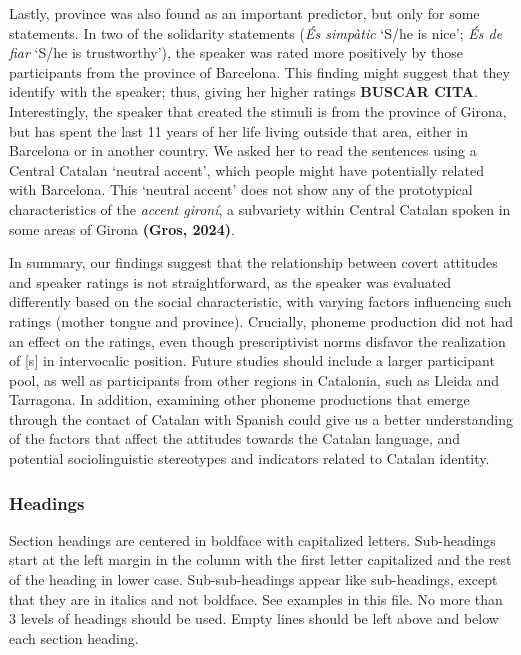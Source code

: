 \documentclass[
  a4paper,
  11pt,
  twocolumn]{article}
\begin{document}
Lastly, province was also found as an important predictor, but only for
some statements. In two of the solidarity statements (\emph{És simpàtic}
`S/he is nice'; \emph{És de fiar} `S/he is trustworthy'), the speaker
was rated more positively by those participants from the province of
Barcelona. This finding might suggest that they identify with the
speaker; thus, giving her higher ratings \textbf{BUSCAR CITA}.
Interestingly, the speaker that created the stimuli is from the province
of Girona, but has spent the last 11 years of her life living outside
that area, either in Barcelona or in another country. We asked her to
read the sentences using a Central Catalan `neutral accent', which
people might have potentially related with Barcelona. This `neutral
accent' does not show any of the prototypical characteristics of the
\emph{accent gironí}, a subvariety within Central Catalan spoken in some
areas of Girona \textbf{(Gros, 2024)}.

In summary, our findings suggest that the relationship between covert
attitudes and speaker ratings is not straightforward, as the speaker was
evaluated differently based on the social characteristic, with varying
factors influencing such ratings (mother tongue and province).
Crucially, phoneme production did not had an effect on the ratings, even
though prescriptivist norms disfavor the realization of {[}s{]} in
intervocalic position. Future studies should include a larger
participant pool, as well as participants from other regions in
Catalonia, such as Lleida and Tarragona. In addition, examining other
phoneme productions that emerge through the contact of Catalan with
Spanish could give us a better understanding of the factors that affect
the attitudes towards the Catalan language, and potential
sociolinguistic stereotypes and indicators related to Catalan identity.

\subsubsection{Headings}

Section headings are centered in boldface with capitalized letters.
Sub-headings start at the left margin in the column with the first
letter capitalized and the rest of the heading in lower case.
Sub-sub-headings appear like sub-headings, except that they are in
italics and not boldface. See examples in this file. No more than 3
levels of headings should be used. Empty lines should be left above and
below each section heading.
\end{document}
